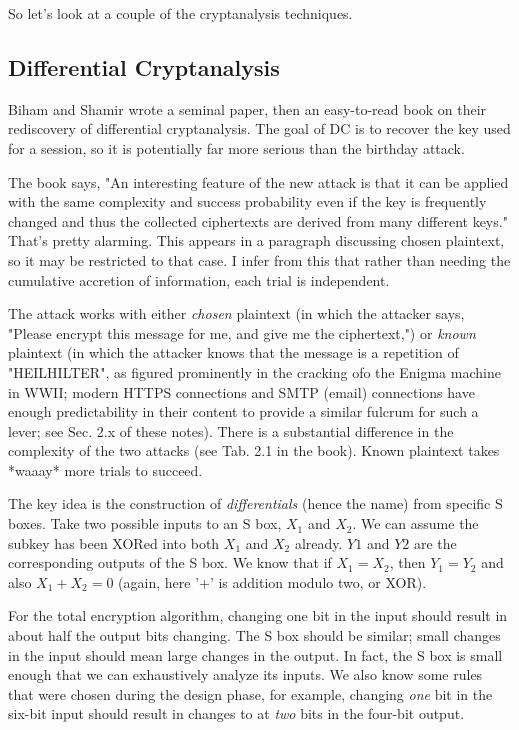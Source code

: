 \documentclass[%
 aip,
 jmp,%
 amsmath,amssymb,
 reprint,%
]{revtex4-1}
\begin{document}
So let's look at a couple of the cryptanalysis techniques.

\subsection{Differential Cryptanalysis}

Biham and Shamir wrote a seminal paper, then an easy-to-read book on
their rediscovery of differential cryptanalysis.  The goal of DC is to
recover the key used for a session, so it is potentially far more
serious than the birthday attack.

The book says, "An interesting feature of the new attack is that it
can be applied with the same complexity and success probability even
if the key is frequently changed and thus the collected ciphertexts
are derived from many different keys."  That's pretty alarming.  This
appears in a paragraph discussing chosen plaintext, so it may be
restricted to that case.  I infer from this that rather than needing
the cumulative accretion of information, each trial is independent.

The attack works with either \emph{chosen} plaintext (in which the attacker
says, "Please encrypt this message for me, and give me the
ciphertext,") or \emph{known} plaintext (in which the attacker knows that
the message is a repetition of "HEILHILTER", as figured prominently in
the cracking ofo the Enigma machine in WWII; modern HTTPS connections and
SMTP (email) connections have enough predictability in their content
to provide a similar fulcrum for such a lever; see Sec. 2.x of these
notes).  There is a substantial difference in the complexity of the
two attacks (see Tab. 2.1 in the book).  Known plaintext takes *waaay*
more trials to succeed.


The key idea is the construction of \emph{differentials} (hence the name)
from specific S boxes.  Take two possible inputs to an S box, $X_1$
and $X_2$.  We can assume the subkey has been XORed into both $X_1$
and $X_2$ already.  $Y1$ and $Y2$ are the corresponding outputs of the
S box.  We know that if $X_1 = X_2$, then $Y_1 = Y_2$ and also $X_1 +
X_2 = 0$ (again, here '+' is addition modulo two, or XOR).

For the total encryption algorithm, changing one bit in the input
should result in about half the output bits changing.  The S box
should be similar; small changes in the input should mean large
changes in the output.  In fact, the S box is small enough that we can
exhaustively analyze its inputs.  We also know some rules that were
chosen during the design phase, for example, changing \emph{one} bit in the
six-bit input should result in changes to at \emph{two} bits in the
four-bit output.
\end{document}
